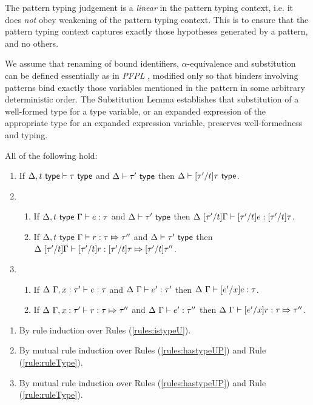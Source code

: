 {{{{The {pattern typing judgement} is a \emph{linear} in the pattern typing context, i.e. it does \emph{not} obey weakening of the pattern typing context. This is to ensure that the pattern typing context captures exactly those hypotheses generated by a pattern, and no others.

We assume that renaming of bound identifiers, $\alpha$-equivalence and substitution can be defined essentially as in \emph{PFPL} \cite{pfpl}, modified only so that binders involving patterns bind exactly those variables mentioned in the pattern in some arbitrary deterministic order. The Substitution Lemma establishes that substitution of a well-formed type for a type variable, or an expanded expression of the appropriate type for an expanded expression variable, preserves well-formedness and typing.
\begin{lemma}[Substitution]\label{lemma:substitution-UP} All of the following hold:
\begin{enumerate}
\item If $\Delta, t~\mathsf{type} \vdash \tau~\mathsf{type}$ and $\Delta \vdash \tau'~\mathsf{type}$ then $\Delta \vdash [\tau'/t]\tau~\mathsf{type}$.
\item \begin{enumerate}
  \item If $\Delta, t~\mathsf{type}~\Gamma \vdash e : \tau$ and $\Delta \vdash \tau'~\mathsf{type}$ then $\Delta~[\tau'/t]\Gamma \vdash [\tau'/t]e : [\tau'/t]\tau$.
  \item If $\Delta, t~\mathsf{type}~\Gamma \vdash r : \tau \Mapsto \tau''$ and $\Delta \vdash \tau'~\mathsf{type}$ then $\Delta~[\tau'/t]\Gamma \vdash [\tau'/t]r : [\tau'/t]\tau \Mapsto [\tau'/t]\tau''$.
  \end{enumerate}
\item \begin{enumerate}
  \item If $\Delta~\Gamma, x : \tau' \vdash e : \tau$ and $\Delta~\Gamma \vdash e' : \tau'$ then $\Delta~\Gamma \vdash [e'/x]e : \tau$.
  \item If $\Delta~\Gamma, x : \tau' \vdash r : \tau \Mapsto \tau''$ and $\Delta~\Gamma \vdash e' : \tau''$ then $\Delta~\Gamma \vdash [e'/x]r : \tau \Mapsto \tau''$.
  \end{enumerate}
\end{enumerate}\end{lemma}
\begin{proof-sketch}
\begin{enumerate}
\item By rule induction over Rules (\ref{rules:istypeU}).
\item By mutual rule induction over Rules (\ref{rules:hastypeUP}) and Rule (\ref{rule:ruleType}).
\item By mutual rule induction over Rules (\ref{rules:hastypeUP}) and Rule (\ref{rule:ruleType}).
\end{enumerate}
\end{proof-sketch}

}}}}
